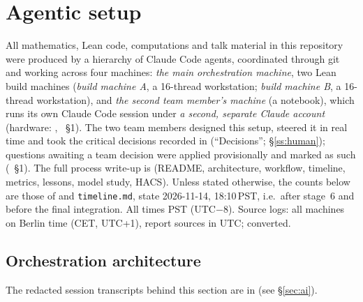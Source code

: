 \section{Agentic setup}\label{sec:agentic}

\begin{sloppypar}
All mathematics, Lean code, computations and talk material in this repository were produced by a hierarchy of
Claude Code agents, coordinated through git and working across four machines: \emph{the main orchestration machine},
two Lean build machines (\emph{build machine A}, a 16-thread workstation; \emph{build machine B}, a 16-thread workstation),
and \emph{the second team member's machine} (a notebook), which runs
its own Claude Code session under \emph{a second, separate Claude account} (hardware:
, ~\S1). The two team members designed this setup,
steered it in real time and took the critical decisions recorded in  (``Decisions''; \S\ref{ss:human});
questions awaiting a team decision were applied provisionally and marked as such (~\S1). The full
process write-up is  (README, architecture, workflow, timeline, metrics, lessons,
model study, HACS). Unless stated otherwise, the counts below are those of
 and \texttt{timeline.md}, state 2026-11-14, 18:10\,PST, i.e.\ after stage~6
and before the final integration. All times PST (UTC$-$8). Source logs: all machines on Berlin time (CET, UTC+1), report sources in UTC; converted.
\end{sloppypar}

\subsection{Orchestration architecture}
The redacted session transcripts behind this section are in  (see \S\ref{sec:ai}).

